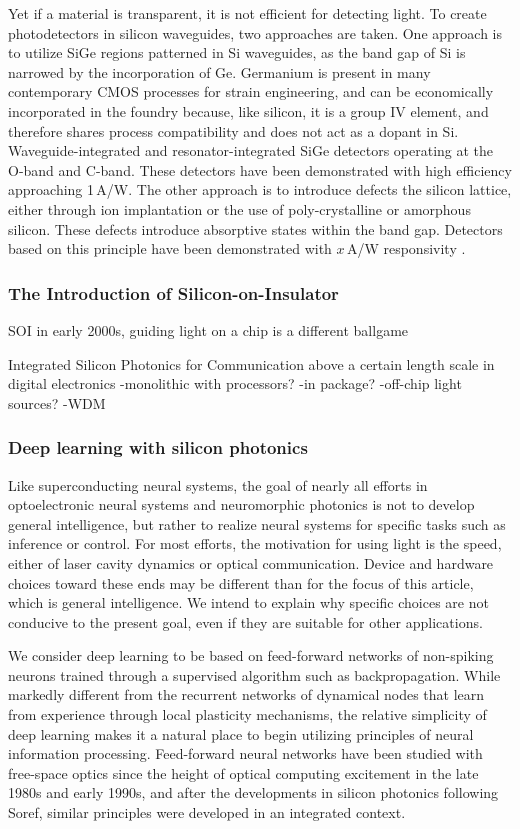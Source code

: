 Yet if a material is transparent, it is not efficient for detecting light. To create photodetectors in silicon waveguides, two approaches are taken. One approach is to utilize SiGe regions patterned in Si waveguides, as the band gap of Si is narrowed by the incorporation of Ge. Germanium is present in many contemporary CMOS processes for strain engineering, and can be economically incorporated in the foundry because, like silicon, it is a group IV element, and therefore shares process compatibility and does not act as a dopant in Si. Waveguide-integrated \cite{} and resonator-integrated \cite{} SiGe detectors operating at the O-band and C-band. These detectors have been demonstrated with high efficiency approaching 1\,A/W. The other approach is to introduce defects the silicon lattice, either through ion implantation or the use of poly-crystalline or amorphous silicon. These defects introduce absorptive states within the band gap. Detectors based on this principle have been demonstrated with $x$\,A/W responsivity \cite{meor2014}. 

\subsubsection{The Introduction of Silicon-on-Insulator}
SOI in early 2000s, guiding light on a chip is a different ballgame

\vspace{3em}
Integrated Silicon Photonics for Communication above a certain length scale in digital electronics
-monolithic with processors?
-in package?
-off-chip light sources?
-WDM

\subsubsection{Deep learning with silicon photonics}
Like superconducting neural systems, the goal of nearly all efforts in optoelectronic neural systems and neuromorphic photonics is not to develop general intelligence, but rather to realize neural systems for specific tasks such as inference or control. For most efforts, the motivation for using light is the speed, either of laser cavity dynamics or optical communication. Device and hardware choices toward these ends may be different than for the focus of this article, which is general intelligence. We intend to explain why specific choices are not conducive to the present goal, even if they are suitable for other applications.

We consider deep learning to be based on feed-forward networks of non-spiking neurons trained through a supervised algorithm such as backpropagation. While markedly different from the recurrent networks of dynamical nodes that learn from experience through local plasticity mechanisms, the relative simplicity of deep learning makes it a natural place to begin utilizing principles of neural information processing. Feed-forward neural networks have been studied with free-space optics since the height of optical computing excitement in the late 1980s and early 1990s, and after the developments in silicon photonics following Soref, similar principles were developed in an integrated context. 

